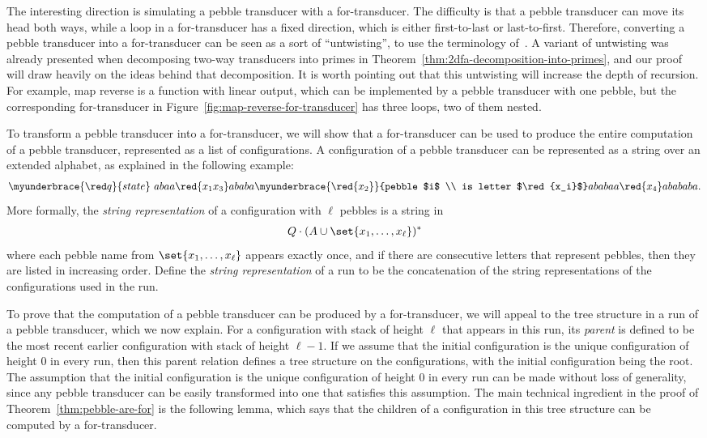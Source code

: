 The interesting direction is simulating a pebble transducer with a for-transducer.
The difficulty is that a pebble transducer can move its head both ways, while a loop in a for-transducer has a fixed direction, which is either first-to-last or last-to-first.  Therefore, converting a pebble transducer into a for-transducer can be seen as a sort of ``untwisting'', to use the terminology of~\cite{baschenis2017}. A variant of untwisting was already presented when decomposing two-way transducers into primes in Theorem~\ref{thm:2dfa-decomposition-into-primes}, and our proof will draw heavily on the ideas behind that decomposition. It is worth pointing out that this untwisting will increase the depth of recursion. For example, map reverse is a function with linear output, which can be implemented by a pebble transducer with one pebble, but the corresponding for-transducer in Figure~\ref{fig:map-reverse-for-transducer} has three loops, two of them nested.




To transform a pebble transducer into a for-transducer, we will show that a for-transducer can be used to produce the entire computation of a pebble transducer, represented as a list of configurations.
A configuration of a pebble transducer can be represented as a string over an extended alphabet, as explained in the following example:
\begin{align*}
\myunderbrace{\red q}{state}\ abaa \red{x_1 x_3} ababa \myunderbrace{\red{x_2}}{pebble $i$ \\ is letter $\red{x_i}$} ababaa \red{x_4} abababa.
\end{align*}
More formally, the \emph{string representation} of a configuration with $\ell$ pebbles is a string in 
\begin{align*}
Q \cdot (A \cup \set{x_1,\ldots,x_\ell})^*
\end{align*}
where each pebble name from $\set{x_1,\ldots,x_\ell}$ appears exactly once, and if there are consecutive letters that represent pebbles, then they are listed in increasing order. Define the \emph{string representation} of a run to be the concatenation of the string representations of the configurations used in the run. 

To prove that the computation of a pebble transducer can be produced by a for-transducer,  we will appeal to the  tree structure in a run of a pebble transducer, which we now explain.
     For a configuration with stack of height $\ell$ that appears in this run, its \emph{parent} is defined to be the most recent earlier configuration with stack of height $\ell-1$. If we assume that the initial configuration is the unique configuration of height $0$ in every run, then  this parent relation defines a tree structure on the configurations, with the initial configuration being the root. The assumption that the initial configuration is the unique configuration of height $0$ in every run can be made without loss of generality, since any pebble transducer can be easily transformed into one that satisfies this assumption. The main technical ingredient in the proof of Theorem~\ref{thm:pebble-are-for} is the following lemma, which says that the children of a configuration in this tree structure can be computed by a for-transducer.

